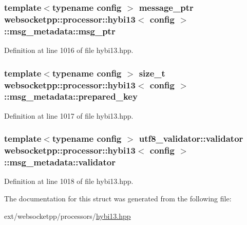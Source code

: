 \subsubsection[{msg\+\_\+ptr}]{\setlength{\rightskip}{0pt plus 5cm}template$<$typename config $>$ {\bf message\+\_\+ptr} {\bf websocketpp\+::processor\+::hybi13}$<$ config $>$\+::msg\+\_\+metadata\+::msg\+\_\+ptr}\label{structwebsocketpp_1_1processor_1_1hybi13_1_1msg__metadata_a49e276abf3be14de45a9111cb13e3d81}


Definition at line 1016 of file hybi13.\+hpp.

\hypertarget{structwebsocketpp_1_1processor_1_1hybi13_1_1msg__metadata_a4c0cf4af697b0a12396ca5570a888ec1}{}
\subsubsection[{prepared\+\_\+key}]{\setlength{\rightskip}{0pt plus 5cm}template$<$typename config $>$ size\+\_\+t {\bf websocketpp\+::processor\+::hybi13}$<$ config $>$\+::msg\+\_\+metadata\+::prepared\+\_\+key}\label{structwebsocketpp_1_1processor_1_1hybi13_1_1msg__metadata_a4c0cf4af697b0a12396ca5570a888ec1}


Definition at line 1017 of file hybi13.\+hpp.

\hypertarget{structwebsocketpp_1_1processor_1_1hybi13_1_1msg__metadata_a283c8d119c2c9f2543a2247b465c9416}{}
\subsubsection[{validator}]{\setlength{\rightskip}{0pt plus 5cm}template$<$typename config $>$ {\bf utf8\+\_\+validator\+::validator} {\bf websocketpp\+::processor\+::hybi13}$<$ config $>$\+::msg\+\_\+metadata\+::validator}\label{structwebsocketpp_1_1processor_1_1hybi13_1_1msg__metadata_a283c8d119c2c9f2543a2247b465c9416}


Definition at line 1018 of file hybi13.\+hpp.



The documentation for this struct was generated from the following file\+:\begin{DoxyCompactItemize}
\item 
ext/websocketpp/processors/\hyperlink{hybi13_8hpp}{hybi13.\+hpp}\end{DoxyCompactItemize}
